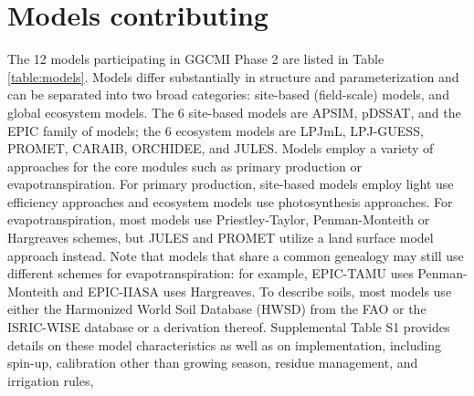 \documentclass[gmd, manuscript]{copernicus} %
\begin{document}
\section{Models contributing}
\label{S:3}

The 12 models participating in GGCMI Phase 2 are listed in Table \ref{table:models}. 
Models differ substantially in structure and parameterization and can be separated into two broad categories: site-based (field-scale) models, and global ecosystem models.
The 6 site-based models are APSIM, pDSSAT, and the EPIC family of models; the 6 ecosystem models are LPJmL, LPJ-GUESS, PROMET, CARAIB, ORCHIDEE, and JULES.
Models employ a variety of approaches for the core modules such as primary production or evapotranspiration.
For primary production, site-based models employ light use efficiency approaches and ecosystem models use photosynthesis approaches.
For evapotranspiration, most models use Priestley-Taylor, Penman-Monteith or Hargreaves schemes, but JULES and PROMET utilize a land surface model approach instead. 
Note that models that share a common genealogy may still use different schemes for evapotranspiration:
for example, EPIC-TAMU uses Penman-Monteith and EPIC-IIASA uses Hargreaves.
To describe soils, most models use either the Harmonized World Soil Database (HWSD) from the FAO \citep{FAOSOIL2008} or the ISRIC-WISE database \citep{BatjesL2008} or a derivation thereof.
Supplemental Table S1 provides details on these model characteristics as well as on implementation, including spin-up, calibration other than growing season, residue management, and irrigation rules,
\end{document}
